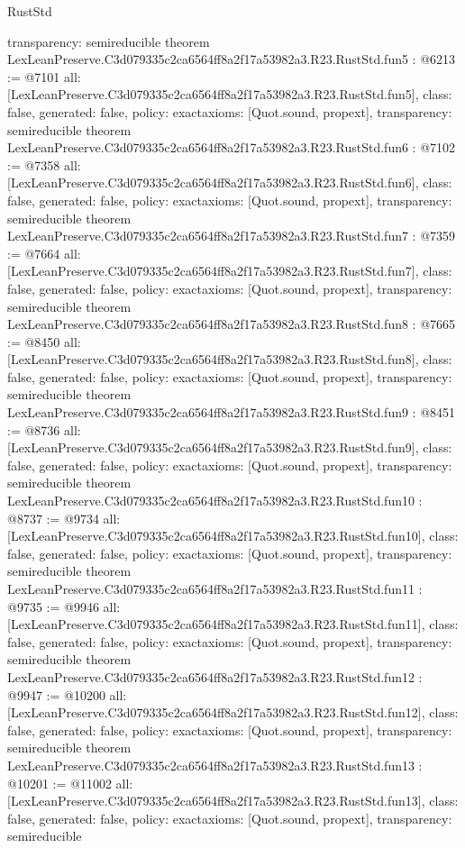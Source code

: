 \begin{lexlean}{RustStd}
\begin{coremodule}
{  transparency: semireducible
}
theorem LexLeanPreserve.C3d079335c2ca6564ff8a2f17a53982a3.R23.RustStd.fun5 : @6213 := @7101 {
  all: [LexLeanPreserve.C3d079335c2ca6564ff8a2f17a53982a3.R23.RustStd.fun5],
  class: false,
  generated: false,
  policy: exact{axioms: [Quot.sound, propext]},
  transparency: semireducible
}
theorem LexLeanPreserve.C3d079335c2ca6564ff8a2f17a53982a3.R23.RustStd.fun6 : @7102 := @7358 {
  all: [LexLeanPreserve.C3d079335c2ca6564ff8a2f17a53982a3.R23.RustStd.fun6],
  class: false,
  generated: false,
  policy: exact{axioms: [Quot.sound, propext]},
  transparency: semireducible
}
theorem LexLeanPreserve.C3d079335c2ca6564ff8a2f17a53982a3.R23.RustStd.fun7 : @7359 := @7664 {
  all: [LexLeanPreserve.C3d079335c2ca6564ff8a2f17a53982a3.R23.RustStd.fun7],
  class: false,
  generated: false,
  policy: exact{axioms: [Quot.sound, propext]},
  transparency: semireducible
}
theorem LexLeanPreserve.C3d079335c2ca6564ff8a2f17a53982a3.R23.RustStd.fun8 : @7665 := @8450 {
  all: [LexLeanPreserve.C3d079335c2ca6564ff8a2f17a53982a3.R23.RustStd.fun8],
  class: false,
  generated: false,
  policy: exact{axioms: [Quot.sound, propext]},
  transparency: semireducible
}
theorem LexLeanPreserve.C3d079335c2ca6564ff8a2f17a53982a3.R23.RustStd.fun9 : @8451 := @8736 {
  all: [LexLeanPreserve.C3d079335c2ca6564ff8a2f17a53982a3.R23.RustStd.fun9],
  class: false,
  generated: false,
  policy: exact{axioms: [Quot.sound, propext]},
  transparency: semireducible
}
theorem LexLeanPreserve.C3d079335c2ca6564ff8a2f17a53982a3.R23.RustStd.fun10 : @8737 := @9734 {
  all: [LexLeanPreserve.C3d079335c2ca6564ff8a2f17a53982a3.R23.RustStd.fun10],
  class: false,
  generated: false,
  policy: exact{axioms: [Quot.sound, propext]},
  transparency: semireducible
}
theorem LexLeanPreserve.C3d079335c2ca6564ff8a2f17a53982a3.R23.RustStd.fun11 : @9735 := @9946 {
  all: [LexLeanPreserve.C3d079335c2ca6564ff8a2f17a53982a3.R23.RustStd.fun11],
  class: false,
  generated: false,
  policy: exact{axioms: [Quot.sound, propext]},
  transparency: semireducible
}
theorem LexLeanPreserve.C3d079335c2ca6564ff8a2f17a53982a3.R23.RustStd.fun12 : @9947 := @10200 {
  all: [LexLeanPreserve.C3d079335c2ca6564ff8a2f17a53982a3.R23.RustStd.fun12],
  class: false,
  generated: false,
  policy: exact{axioms: [Quot.sound, propext]},
  transparency: semireducible
}
theorem LexLeanPreserve.C3d079335c2ca6564ff8a2f17a53982a3.R23.RustStd.fun13 : @10201 := @11002 {
  all: [LexLeanPreserve.C3d079335c2ca6564ff8a2f17a53982a3.R23.RustStd.fun13],
  class: false,
  generated: false,
  policy: exact{axioms: [Quot.sound, propext]},
  transparency: semireducible
}
\end{coremodule}
\end{lexlean}
